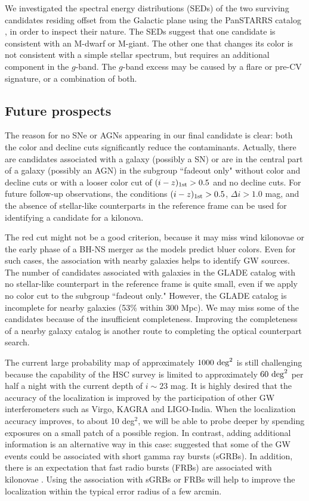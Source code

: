 \documentclass[]{pasj01}
\begin{document}
We investigated the spectral energy distributions (SEDs) of the two surviving candidates residing offset from the Galactic plane
using the PanSTARRS catalog \citep{2016arXiv161205560C}, in order to inspect their nature.
The SEDs suggest that one candidate is consistent with an M-dwarf or M-giant.
The other one that changes its color is not consistent with a simple stellar spectrum, but requires an additional component in the $g$-band.
The $g$-band excess may be caused by a flare or pre-CV signature, or a combination of both.


\subsection{Future prospects}
The reason for no SNe or AGNs appearing in our final candidate is clear:
both the color and decline cuts significantly reduce the contaminants.
Actually, there are candidates associated with a galaxy (possibly a SN) or are in the central part of a galaxy (possibly an AGN)
in the subgroup ``fadeout only"  without color and decline cuts or with a looser color cut of $(i-z)_{\rm 1st}>0.5$ and no decline cuts.
For future follow-up observations,
the conditions $(i-z)_{\rm 1st}>0.5$, $\Delta i>1.0$ mag, and the absence of stellar-like counterparts in the reference frame 
can be used for identifying a  candidate for a kilonova.

The red cut might not be a good criterion, because it may miss wind kilonovae or the early phase of a BH-NS merger as the models predict bluer colors.
Even for such cases, the association with nearby galaxies helps to identify GW sources.
The number of candidates associated with galaxies in the GLADE catalog with no stellar-like counterpart in the reference frame is quite small,
even if we apply  no color cut to the subgroup ``fadeout only." 
However, the GLADE catalog is incomplete for nearby galaxies (53\% within 300 Mpc).
We may miss some of the candidates because of the insufficient completeness.
Improving the completeness of a nearby galaxy catalog is another route to completing the optical counterpart search.

The current large probability map of approximately $1000{\rm ~deg}^2$ is still challenging 
because the capability of the HSC survey is limited to approximately $60~{\rm deg}^2$ per half a night with the current depth of $i\sim 23$ mag.
It is highly desired that the accuracy of the localization is improved  by the participation of other GW interferometers such as Virgo, KAGRA   and LIGO-India.
When the localization accuracy improves, to about 10 deg$^2$, we will be able to probe deeper by spending exposures on a small patch of a possible region.
In contrast, adding additional information is an alternative way in this case:
\citet{2006ApJ...638..354B} suggested that some of the GW events could be associated with short gamma ray bursts (sGRBs).
In addition, there is an expectation that fast radio bursts (FRBs) are associated with kilonovae \citep{2013PASJ...65L..12T}.
Using the association with sGRBs or FRBs will help to improve the localization within the typical error radius of a few arcmin.
\end{document}
